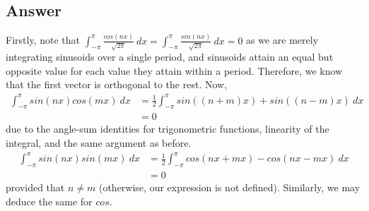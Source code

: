 \documentclass[
	12pt, %
]{fphw}
\begin{document}
\subsection*{Answer}
Firstly, note that $\int_{-\pi}^{\pi}\frac{cos(nx)}{\sqrt{2\pi}}  \ dx = \int_{-\pi}^{\pi}\frac{sin(nx)}{\sqrt{2\pi}} \ dx = 0 $ as we are merely integrating sinusoids over a single period, and sinusoids attain an equal but opposite value for each value they attain within a period. Therefore, we know that the first vector is orthogonal to the rest. 
Now, 
\begin{align}
	\int_{-\pi}^{\pi}sin(nx)cos(mx) \ dx & = \frac{1}{2}\int_{-\pi}^{\pi}sin((n+m)x)+sin((n-m)x) \ dx \\ 
&=0 
\end{align}
due to the angle-sum identities for trigonometric functions, linearity of the integral,  and the same argument as before.
\begin{align}
\int_{-\pi}^{\pi}sin(nx)sin(mx) \ dx &= \frac{1}{2}\int_{-\pi}^{\pi}cos(nx+mx)-cos(nx-mx) \ dx	\\
&= 0  
\end{align}
provided that $n\neq m$ (otherwise, our expression is not defined). Similarly, we may deduce the same for $cos$.
\end{document}

